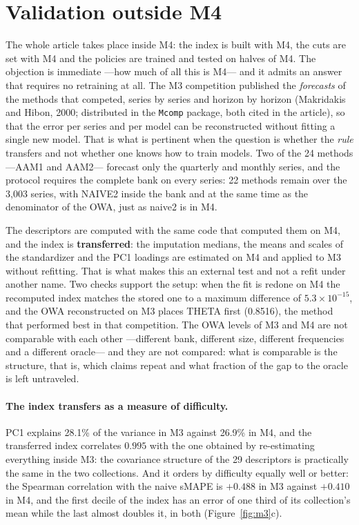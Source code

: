 \section{Validation outside M4}\label{sec:m3}

The whole article takes place inside M4: the index is built with M4, the cuts are set
with M4 and the policies are trained and tested on halves of M4. The objection is
immediate ---how much of all this is M4--- and it admits an answer that requires no
retraining at all. The M3 competition published the \emph{forecasts} of the methods that
competed, series by series and horizon by horizon (Makridakis and Hibon, 2000;
distributed in the \texttt{Mcomp} package, both cited in the article), so that the error
per series and per model can be reconstructed without fitting a single new model. That is
what is pertinent when the question is whether the \emph{rule} transfers and not whether
one knows how to train models. Two of the 24 methods ---AAM1 and AAM2--- forecast only
the quarterly and monthly series, and the protocol requires the complete bank on every
series: 22 methods remain over the 3,003 series, with NAIVE2 inside the bank and at the
same time as the denominator of the OWA, just as naive2 is in M4.

The descriptors are computed with the same code that computed them on M4, and the index
is \textbf{transferred}: the imputation medians, the means and scales of the
standardizer and the PC1 loadings are estimated on M4 and applied to M3 without
refitting. That is what makes this an external test and not a refit under another name.
Two checks support the setup: when the fit is redone on M4 the recomputed index matches
the stored one to a maximum difference of $5.3\times10^{-15}$, and the OWA reconstructed
on M3 places THETA first (0.8516), the method that performed best in that competition.
The OWA levels of M3 and M4 are not comparable with each other ---different bank,
different size, different frequencies and a different oracle--- and they are not
compared: what is comparable is the structure, that is, which claims repeat and what
fraction of the gap to the oracle is left untraveled.

\paragraph{The index transfers as a measure of difficulty.} PC1 explains 28.1\% of the
variance in M3 against 26.9\% in M4, and the transferred index correlates $0.995$ with
the one obtained by re-estimating everything inside M3: the covariance structure of the
29 descriptors is practically the same in the two collections. And it orders by
difficulty equally well or better: the Spearman correlation with the naive sMAPE is
$+0.488$ in M3 against $+0.410$ in M4, and the first decile of the index has an error of
one third of its collection's mean while the last almost doubles it, in both
(Figure~\ref{fig:m3}c).

